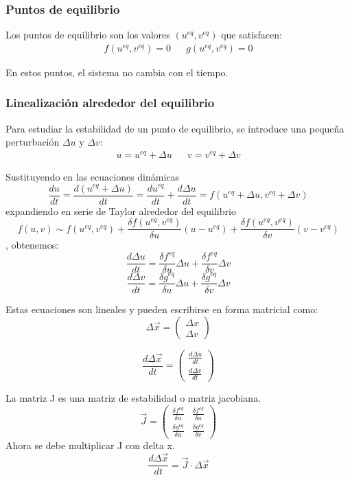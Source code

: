 \subsubsection{Puntos de equilibrio}
Los puntos de equilibrio son los valores $(u^{eq}, v^{eq})$ que satisfacen:
\begin{align*}
f(u^{eq}, v^{eq}) = 0 && g(u^{eq}, v^{eq}) = 0
\end{align*}

En estos puntos, el sistema no cambia con el tiempo.

\subsubsection{Linealización alrededor del equilibrio}
Para estudiar la estabilidad de un punto de equilibrio, se introduce una pequeña perturbación $\Delta u$ y $\Delta v$:
\begin{align*}
u = u^{eq} + \Delta u && v = v^{eq} + \Delta v
\end{align*}

Sustituyendo en las ecuaciones dinámicas
$$\frac{du}{dt} = \frac{d(u^{eq} + \Delta u)}{dt} = \frac{du^{eq}}{dt} + \frac{d \Delta u}{dt} = f(u^{eq} + \Delta u, v^{eq} + \Delta v)$$
expandiendo en serie de Taylor alrededor del equilibrio
$$f(u, v) \sim f(u^{eq}, v^{eq}) + \frac{\delta f(u^{eq}, v^{eq})}{\delta u}(u - u^{eq}) + \frac{\delta f(u^{eq}, v^{eq})}{\delta v}(v - v^{eq})$$
, obtenemos:
$$\frac{d \Delta u}{dt} = \frac{\delta f^{eq}}{\delta u} \Delta u + \frac{\delta f^{eq}}{\delta v} \Delta v$$
$$\frac{d \Delta v}{dt} = \frac{\delta g^{eq}}{\delta u} \Delta u + \frac{\delta g^{eq}}{\delta v} \Delta v$$

Estas ecuaciones son lineales y pueden escribirse en forma matricial como:
$$\Delta \vec{x} = \begin{pmatrix}
\Delta x \\ \Delta v
\end{pmatrix} $$

$$\frac{d \Delta \vec{x}}{dt} = \begin{pmatrix}
\frac{d \Delta u}{dt} \\ \frac{d \Delta v}{dt}
\end{pmatrix}$$

La matriz J es una matriz de estabilidad o matriz jacobiana.
$$\vec{J} = \begin{pmatrix}
\frac{\delta f^{eq}}{\delta u} & \frac{\delta f^{eq}}{\delta u} \\
\frac{\delta g^{eq}}{\delta u} & \frac{\delta g^{eq}}{\delta v}
\end{pmatrix}$$
Ahora se debe multiplicar J con delta x.
$$\frac{d \Delta \vec{x}}{dt} = \vec{J} \cdot \Delta \vec{x}$$

